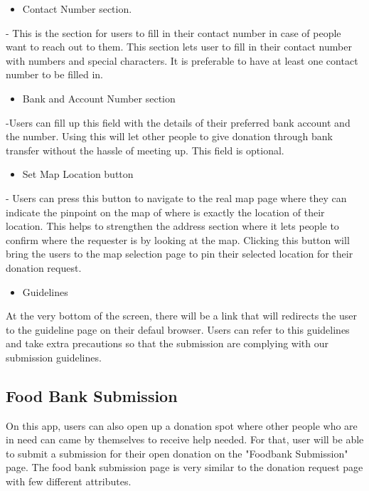 \documentclass[conference]{IEEEtran}
\begin{document}
\begin{itemize}
\item Contact Number section.
\end{itemize}
- This is the section for users to fill in their contact number in case of people want to reach out to them. This section lets user to fill in their contact number with numbers and special characters. It is preferable to have at least one contact number to be filled in.\\

\begin{itemize}
\item Bank and Account Number section
\end{itemize}
-Users can fill up this field with the details of their preferred bank account and the number. Using this will let other people to give donation through bank transfer without the hassle of meeting up. This field is optional.\\ 


\begin{itemize}
\item Set Map Location button 
\end{itemize}
- Users can press this button to navigate to the real map page where they can indicate the pinpoint on the map of where is exactly the location of their location. This helps to strengthen the address section where it lets people to confirm where the requester is by looking at the map. Clicking this button will bring the users to the map selection page to pin their selected location for their donation request. \\

\begin{itemize}
\item Guidelines
\end{itemize}
At the very bottom of the screen, there will be a link that will redirects the user to the guideline page on their defaul browser. Users can refer to this guidelines and take extra precautions so that the submission are complying with our submission guidelines.

\subsection{Food Bank Submission}

On this app, users can also open up a donation spot where other people who are in need can came by themselves to receive help needed. For that, user will be able to submit a submission for their open donation on the "Foodbank Submission" page. The food bank submission page is very similar to the donation request page with few different attributes.
\end{document}
